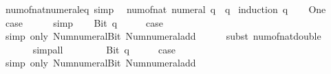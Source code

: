 \begin{isabellebody}
\endisatagproof
{\isafoldproof}%
%
\isadelimproof
\isanewline
%
\endisadelimproof
\isanewline
{}\isamarkupfalse%
\ num{\isacharunderscore}{\kern0pt}of{\isacharunderscore}{\kern0pt}nat{\isacharunderscore}{\kern0pt}numeral{\isacharunderscore}{\kern0pt}eq\ {\isacharbrackleft}{\kern0pt}simp{\isacharbrackright}{\kern0pt}{\isacharcolon}{\kern0pt}\isanewline
\ \ {\isacartoucheopen}num{\isacharunderscore}{\kern0pt}of{\isacharunderscore}{\kern0pt}nat\ {\isacharparenleft}{\kern0pt}numeral\ q{\isacharparenright}{\kern0pt}\ {\isacharequal}{\kern0pt}\ q{\isacartoucheclose}\isanewline
%
\isadelimproof
%
\endisadelimproof
%
\isatagproof
{}\isamarkupfalse%
\ {\isacharparenleft}{\kern0pt}induction\ q{\isacharparenright}{\kern0pt}\isanewline
\ \ \isamarkupfalse%
\ One\isanewline
\ \ \isamarkupfalse%
\ \isamarkupfalse%
\ {\isacharquery}{\kern0pt}case\isanewline
\ \ \ \ \isamarkupfalse%
\ simp\isanewline
{}\isamarkupfalse%
\isanewline
\ \ \isamarkupfalse%
\ {\isacharparenleft}{\kern0pt}Bit{}\ q{\isacharparenright}{\kern0pt}\isanewline
\ \ \isamarkupfalse%
\ \isamarkupfalse%
\ {\isacharquery}{\kern0pt}case\isanewline
\ \ \ \ \isamarkupfalse%
\ {\isacharparenleft}{\kern0pt}simp\ only{\isacharcolon}{\kern0pt}\ Num{\isachardot}{\kern0pt}numeral{\isacharunderscore}{\kern0pt}Bit{}\ Num{\isachardot}{\kern0pt}numeral{\isacharunderscore}{\kern0pt}add{\isacharparenright}{\kern0pt}\isanewline
\ \ \ \ \isamarkupfalse%
\ {\isacharparenleft}{\kern0pt}subst\ num{\isacharunderscore}{\kern0pt}of{\isacharunderscore}{\kern0pt}nat{\isacharunderscore}{\kern0pt}double{\isacharparenright}{\kern0pt}\isanewline
\ \ \ \ \ \isamarkupfalse%
\ simp{\isacharunderscore}{\kern0pt}all\isanewline
\ \ \ \ \isamarkupfalse%
\isanewline
{}\isamarkupfalse%
\isanewline
\ \ \isamarkupfalse%
\ {\isacharparenleft}{\kern0pt}Bit{}\ q{\isacharparenright}{\kern0pt}\isanewline
\ \ \isamarkupfalse%
\ \isamarkupfalse%
\ {\isacharquery}{\kern0pt}case\isanewline
\ \ \ \ \isamarkupfalse%
\ {\isacharparenleft}{\kern0pt}simp\ only{\isacharcolon}{\kern0pt}\ Num{\isachardot}{\kern0pt}numeral{\isacharunderscore}{\kern0pt}Bit{}\ Num{\isachardot}{\kern0pt}numeral{\isacharunderscore}{\kern0pt}add{\isacharparenright}{\kern0pt}\isanewline
\ \ \ \ \isamarkupfalse%

\end{isabellebody}
